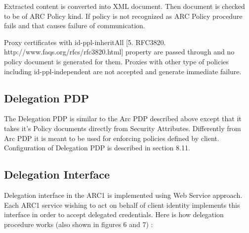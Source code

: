 \documentclass{book}
\begin{document}
Extracted content is converted into XML document. Then document is checked to be of ARC Policy kind. If policy is not recognized as ARC Policy procedure fails and that causes failure of communication.

Proxy certificates with id-ppl-inheritAll [5. RFC3820. http://www.faqs.org/rfcs/rfc3820.html] property are passed through and no policy document is generated for them. Proxies with other type of policies including id-ppl-independent are not accepted and generate immediate failure.

\subsection{Delegation PDP} %
\label{subsec:delegation_pdp}
The Delegation PDP is similar to the Arc PDP described above except that it takes it's Policy documents directly from Security Attributes. Differently from Arc PDP it is meant to be used for enforcing policies defined by client. Configuration of Delegation PDP is described in section 8.11.

\subsection{Delegation Interface} %
\label{subsec:delegation_interface}
Delegation interface in the ARC1 is implemented using Web Service approach. Each ARC1 service wishing to act on behalf of client identity implements this interface in order to accept delegated credentials. Here is how delegation procedure works (also shown in figures 6 and 7) :
\end{document}
